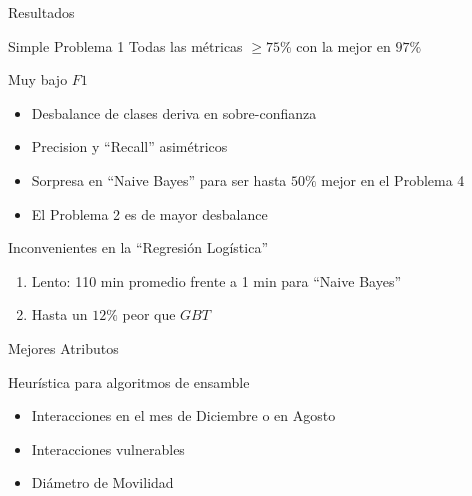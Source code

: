 \documentclass[xcolor=x11names]{beamer}
\begin{document}
\begin{frame}{Resultados}
	
	\begin{block}{Simple Problema 1}
		Todas las métricas $\geq 75\%$ con la mejor en $97\%$
	\end{block}

	\begin{block}{Muy bajo $F1$}
		\begin{itemize}[]
			\item Desbalance de clases deriva en sobre-confianza
			\item Precision y ``Recall'' asimétricos
			\item Sorpresa en ``Naive Bayes'' para ser hasta $50\%$ mejor en el Problema 4
			\item El Problema 2 es de mayor desbalance
		\end{itemize}
	\end{block}

\begin{block}{Inconvenientes en la ``Regresión Logística''}
	\begin{enumerate}[I]
		\item Lento: 110 min promedio frente a 1 min para ``Naive Bayes''
		\item Hasta un $12\%$ peor que $GBT$ 
	\end{enumerate}
\end{block}

\end{frame}


\begin{frame}{Mejores Atributos}
	
		Heurística para algoritmos de ensamble

		\begin{itemize}
			\item Interacciones en el mes de Diciembre o en Agosto
			\item Interacciones vulnerables
			\item Diámetro de Movilidad
		\end{itemize}


\end{frame}
\end{document}
